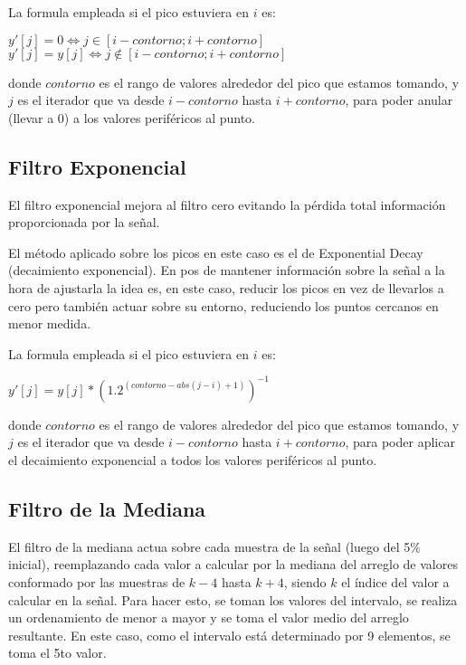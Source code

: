 La formula empleada si el pico estuviera en $i$ es:

\begin{center}
    $y'[j] = 0 \iff j \in [i-contorno; i+contorno]$\\
    $y'[j] = y[j] \iff j \not \in [i-contorno; i+contorno]$\\
\end{center}

donde $contorno$ es el rango de valores alrededor del pico que estamos tomando, y
$j$ es el iterador que va desde $i-contorno$ hasta $i+contorno$, para poder anular
(llevar a 0) a los valores perif\'ericos al punto.

\subsection{Filtro Exponencial}


El filtro exponencial mejora al filtro cero evitando la p\'erdida total
informaci\'on proporcionada por la se\~nal.

El m\'etodo aplicado sobre los picos en este caso es el de Exponential Decay
(decaimiento exponencial). En pos de mantener informaci\'on sobre la se\~nal a
la hora de ajustarla la idea es, en este caso, reducir los picos en vez de
llevarlos a cero pero tambi\'en actuar sobre su entorno, reduciendo los puntos
cercanos en menor medida.

La formula empleada si el pico estuviera en $i$ es:
\begin{center}
$y'[j] = y[j]* (1.2^{(contorno-abs(j-i)+1)})^{-1}$\\
\end{center}
donde $contorno$ es el rango de valores alrededor del pico que estamos tomando, y
$j$ es el iterador que va desde $i-contorno$ hasta $i+contorno$, para poder aplicar
el decaimiento exponencial a todos los valores perif\'ericos al punto.

\subsection{Filtro de la Mediana}

El filtro de la mediana actua sobre cada muestra de la se\~nal (luego del 5\% inicial),
reemplazando cada valor a calcular por la mediana del arreglo de valores conformado por
las muestras de $k - 4$ hasta $k + 4$, siendo $k$ el \'indice del valor a calcular en la 
se\~nal. Para hacer esto, se toman los valores del intervalo, se realiza un ordenamiento
de menor a mayor y se toma el valor medio del arreglo resultante. 
En este caso, como el intervalo est\'a determinado por 9 elementos, se toma el 5to valor.

